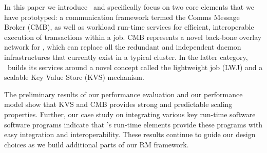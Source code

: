 In this paper we introduce \flux\ and specifically focus on two core 
elements that we have prototyped: a
communication framework termed the Comms Message Broker (CMB), as well as
workload run-time services for efficient, interoperable 
execution of transactions within a job. 
CMB represents a novel back-bone overlay network
for \flux,
which can replace all the redundant and independent 
daemon infrastructures that currently exist in a typical cluster.
In the latter category, \flux\ builds its services
around a novel concept called the lightweight job (LWJ)
and a scalable Key Value Store (KVS) mechanism.

The preliminary results of our performance evaluation 
and our  performance model show that KVS and CMB provides 
strong and predictable scaling properties.
Further, our case study on integrating various key run-time software software
programs indicate that \flux's run-time elements 
provide these programs with 
easy integration and interoperability.
These results continue to guide our design choices
as we build additional parts of our RM framework.


